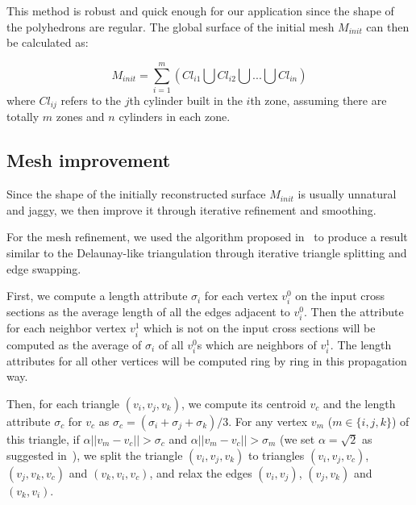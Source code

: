This method is robust and quick enough for our application since the shape
of the polyhedrons are regular. The global surface of the initial mesh
$M_{init}$ can then be calculated as:


\begin{equation}
\label{eq:surfreconstortho}
    M_{init}=\sum\limits_{i=1}^m {(Cl_{i1} \bigcup Cl_{i2} \bigcup {...} \bigcup Cl_{in})}
\end{equation}
where $Cl_{ij}$ refers to the $j$th cylinder built in  the $i$th
zone, assuming there are totally $m$ zones and $n$ cylinders in each
zone.

\subsection{Mesh improvement}
\label{ch4:sec:algo:global:improve}

Since the shape of the initially reconstructed surface $M_{init}$ is usually unnatural and jaggy, we then improve it through iterative refinement and smoothing.

For the mesh refinement, we used the algorithm proposed in~\cite{LP03} to produce a result similar to the Delaunay-like triangulation through iterative triangle splitting and edge swapping.

First, we compute a length attribute $\sigma_i$ for each vertex $v^0_i$ on the input cross sections as the average length of all the edges adjacent to $v^0_i$. Then the attribute for
each neighbor vertex $v^1_i$ which is not on the input cross sections will
be computed as the average of $\sigma_i$ of all $v^0_i$s which are neighbors of $v^1_i$.
The length attributes for all other vertices will be computed ring by ring in
this propagation way.

Then, for each triangle $(v_i, v_j, v_k)$, we compute its centroid $v_c$ and the
length attribute $\sigma_c$ for $v_c$ as
$\sigma_c= (\sigma_i + \sigma_j + \sigma_k)/3$. For any vertex $v_m$ ($m \in \{i,j,k\}$)
of this triangle, if $\alpha ||v_m-v_c||> \sigma_c$ and $\alpha ||v_m-v_c||> \sigma_m$
(we set $\alpha=\sqrt{2}$ as suggested in~\cite{LP03}),
we split the triangle $(v_i, v_j, v_k)$ to triangles $(v_i, v_j, v_c)$,
$(v_j, v_k, v_c)$ and $(v_k, v_i, v_c)$, and relax the edges $(v_i, v_j)$, $(v_j, v_k)$
and $(v_k, v_i)$.

